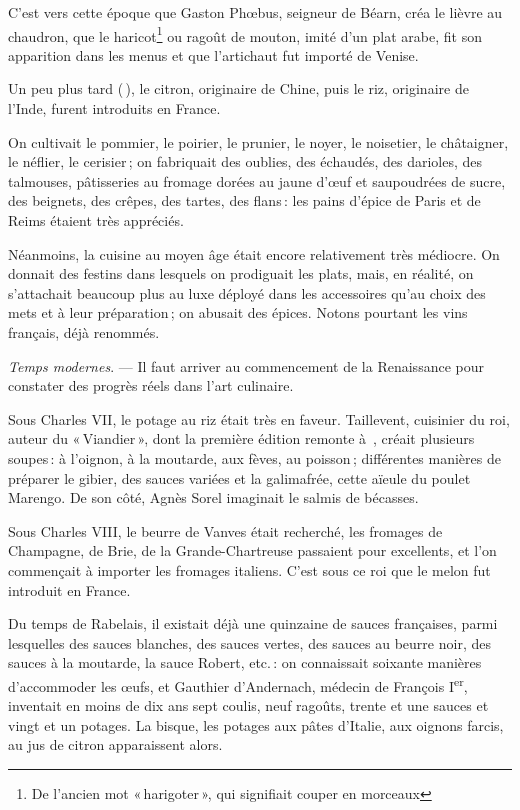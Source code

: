 C'est vers cette époque que Gaston Phœbus, seigneur de Béarn, créa le lièvre au
chaudron, que le haricot\footnote{De l’ancien mot « harigoter », qui signifiait
couper en morceaux} ou ragoût de mouton, imité d'un plat arabe, fit son
apparition dans les menus et que l'artichaut fut importé de Venise.

Un peu plus tard ({\mmm} {\mmm}), le citron, originaire de Chine,
puis le riz, originaire de l'Inde, furent introduits en France.

On cultivait le pommier, le poirier, le prunier, le noyer, le noisetier, le
châtaigner, le néflier, le cerisier ; on fabriquait des oublies, des échaudés,
des darioles, des talmouses, pâtisseries au fromage dorées au jaune d'œuf et
saupoudrées de sucre, des beignets, des crêpes, des tartes, des flans : les
pains d'épice de Paris et de Reims étaient très appréciés.

Néanmoins, la cuisine au moyen âge était encore relativement très médiocre. On
donnait des festins dans lesquels on prodiguait les plats, mais, en réalité, on
s'attachait beaucoup plus au luxe déployé dans les accessoires qu'au choix des
mets et à leur préparation ; on abusait des épices. Notons pourtant les vins
français, déjà renommés.

\sk

\textit{Temps modernes}. — Il faut arriver au commencement de la Renaissance
pour constater des progrès réels dans l’art culinaire.

Sous Charles VII, le potage au riz était très en faveur. Taillevent, cuisinier
du roi, auteur du « Viandier », dont la première édition remonte
à {\mmm} {\mmm}, créait plusieurs soupes : à l'oignon, à la
moutarde, aux fèves, au poisson ; différentes manières de préparer le gibier,
des sauces variées et la galimafrée, cette aïeule du poulet Marengo. De son
côté, Agnès Sorel imaginait le salmis de bécasses.

Sous Charles VIII, le beurre de Vanves était recherché, les fromages de
Champagne, de Brie, de la Grande-Chartreuse passaient pour excellents, et l’on
commençait à importer les fromages italiens. C'est sous ce roi que le melon fut
introduit en France.

Du temps de Rabelais, il existait déjà une quinzaine de sauces françaises,
parmi lesquelles des sauces blanches, des sauces vertes, des sauces au beurre
noir, des sauces à la moutarde, la sauce Robert, etc. : on connaissait soixante
manières d'accommoder les œufs, et Gauthier d'Andernach, médecin de François
I\textsuperscript{er}, inventait en moins de dix ans sept coulis, neuf ragoûts,
trente et une sauces et vingt et un potages. La bisque, les potages aux pâtes
d'Italie, aux oignons farcis, au jus de citron apparaissent alors.


